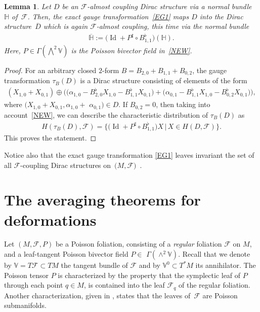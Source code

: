 \documentclass[10pt,a4paper]{amsart}
\numberwithin{equation}{section}
\newtheorem{Lemma}[Theorem]{Lemma}
\begin{document}
\begin{Lemma}\label{lema31}
Let $D$ be an $\mathcal{F}$-almost coupling Dirac structure via a normal bundle~$\mathbb{H}$ of~$\mathcal{F}$. Then, the exact gauge transformation~\eqref{EG1} maps $D$ into the Dirac structure~$\overline{D}$ which is again $\mathcal{F}$-almost coupling, this time via the normal bundle
\begin{gather*}
\mathbb{\overline{H}}:=\big(\operatorname{Id}+P^{\sharp}\circ B_{1,1}^{\flat}\big)(\mathbb{H}).
\end{gather*}
Here, $P\in\Gamma(\bigwedge^{2}\mathbb{V})$ is the Poisson bivector field in~\eqref{NEW}.
\end{Lemma}

\begin{proof}
For an arbitrary closed $2$-form $B=B_{2,0}+B_{1,1}+B_{0,2}$, the gauge transformation $\tau_{B}(D)$ is a Dirac structure consisting of elements
of the form
\begin{gather*}
(X_{1,0}+X_{0,1})\oplus\big( \big(\alpha_{1,0}-B_{2,0}^{\flat}X_{1,0} -B_{1,1}^{\flat}X_{0,1}\big) +\big(\alpha_{0,1}-B_{1,1}^{\flat}X_{1,0}-B_{0,2}^{\flat}X_{0,1}\big)\big) ,
\end{gather*}
where $(X_{1,0}+X_{0,1},\alpha_{1,0}+$ $\alpha_{0,1})\in D$. If $B_{0,2}=0$, then taking into account~\eqref{NEW}, we can describe the characteristic distribution of $\tau_{B}(D)$ as
\begin{gather*}
H(\tau_{B}(D),\mathcal{F})=\big\{\big(\operatorname{Id}+P^{\sharp}\circ B_{1,1}^{\flat}\big)X\,|\, X\in H(D,\mathcal{F})\big\}.
\end{gather*}
This proves the statement.
\end{proof}

Notice also that the exact gauge transformation \eqref{EG1} leaves invariant the set of all $\mathcal{F}$-coupling Dirac structures on~$(M,\mathcal{F)}$~\cite{JVYV-14}.

\section{The averaging theorems for deformations}

Let $(M,\mathcal{F},P)$ be a Poisson foliation, consisting of a \emph{regular} foliation $\mathcal{F}$ on $M$, and a leaf-tangent Poisson bivector f\/ield $P\in$ $\Gamma(\wedge^{2}\mathbb{V})$. Recall that we denote by $\mathbb{V}=T\mathcal{F}\subset TM$ the tangent bundle of $\mathcal{F}$ and by $\mathbb{V}^{0}\subset T^{\ast}M$ its annihilator. The Poisson tensor $P$ is characterized by the property that the symplectic leaf of $P$ through each point $q\in M$, is contained into the leaf $\mathcal{F}_{q}$ of the regular foliation. Another characterization, given in \cite{Va-06}, states that the leaves of~$\mathcal{F}$ are Poisson submanifolds.
\end{document}
